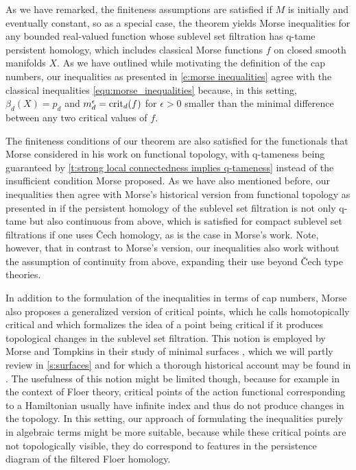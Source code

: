 As we have remarked, the finiteness assumptions are satisfied if $M$ is initially and eventually constant, so as a special case, the theorem yields Morse inequalities for any bounded real-valued function whose sublevel set filtration has q-tame persistent homology, which includes classical Morse functions $f$ on closed smooth manifolds $X$.
As we have outlined while motivating the definition of the cap numbers, our inequalities as presented in \eqref{e:morse inequalities} agree with the classical inequalities \eqref{equ:morse_inequalities} because, in this setting, $\beta_d(X) = p_d$ and $m_d^{\epsilon} = \operatorname{crit}_d(f)$ for $\epsilon > 0$ smaller than the minimal difference between any two critical values of $f$.

The finiteness conditions of our theorem are also satisfied for the functionals that Morse considered in his work on functional topology, with q-tameness being guaranteed by \cref{t:strong local connectedness implies q-tameness} instead of the insufficient condition Morse proposed.
As we have also mentioned before, our inequalities then agree with Morse's historical version from functional topology as presented in \cite{Morse.1940} if the persistent homology of the sublevel set filtration is not only q-tame but also continuous from above, which is satisfied for compact sublevel set filtrations if one uses \v{C}ech homology, as is the case in Morse's work.
Note, however, that in contrast to Morse's version, our inequalities also work without the assumption of continuity from above, expanding their use beyond \v{C}ech type theories.

\begin{rem}
	In addition to the formulation of the inequalities in terms of cap numbers, Morse also proposes a generalized version of critical points, which he calls homotopically critical and which formalizes the idea of a point being critical if it produces topological changes in the sublevel set filtration.
	This notion is employed by Morse and Tompkins in their study of minimal surfaces \cite{Morse.1939}, which we will partly review in \cref{s:surfaces} and for which a thorough historical account may be found in \cite[Section II.6]{Struwe.1988}.
	The usefulness of this notion might be limited though, because for example in the context of Floer theory, critical points of the action functional corresponding to a Hamiltonian usually have infinite index and thus do not produce changes in the topology.
	In this setting, our approach of formulating the inequalities purely in algebraic terms might be more suitable, because while these critical points are not topologically visible, they do correspond to features in the persistence diagram of the filtered Floer homology.
\end{rem}
